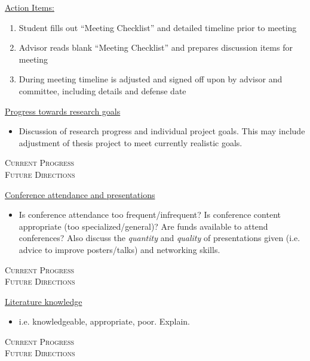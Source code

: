 \documentclass[12pt,onecolumn]{article}
\begin{document}
{\large
\underline{Action Items:}\\
\begin{enumerate}
\item Student fills out ``Meeting Checklist'' and detailed timeline prior to meeting
\item Advisor reads blank ``Meeting Checklist'' and prepares discussion items for meeting
\item During meeting timeline is adjusted and signed off upon by advisor 
and committee, including details and defense date
\end{enumerate}}

\newpage


{\large
\underline{Progress towards research goals}}
\begin{itemize}
\item Discussion of research progress and individual project goals. This may include 
adjustment of thesis project to meet currently realistic goals.
\end{itemize}

\textsc{Current Progress}\\ \vspace{36pt}
\textsc{Future Directions}\\ \vspace{42pt}

{\large
\underline{Conference attendance and presentations}}
\begin{itemize}
\item Is conference attendance too frequent/infrequent? Is conference content  appropriate (too specialized/general)? Are funds available to attend conferences? Also discuss the \emph{quantity} and \emph{quality} of presentations given (i.e. advice to improve posters/talks) and networking skills.
\end{itemize}

\textsc{Current Progress}\\ \vspace{36pt}
\textsc{Future Directions}\\ \vspace{42pt}

{\large
\underline{Literature knowledge}}
\begin{itemize}
\item i.e. knowledgeable, appropriate, poor. Explain.
\end{itemize}

\textsc{Current Progress}\\ \vspace{24pt}
\textsc{Future Directions}\\ \vspace{36pt}
\end{document}
